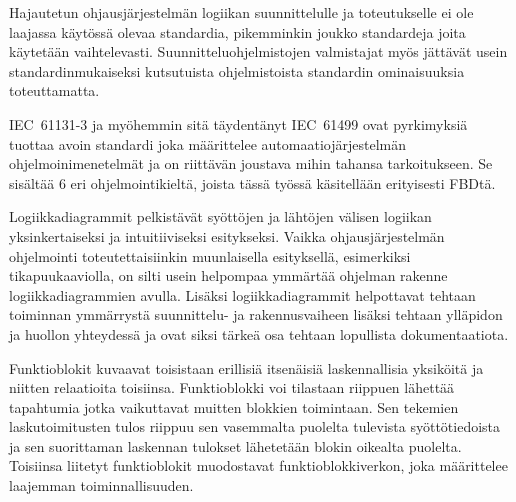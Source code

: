 \documentclass[finnish,12pt]{article}
\begin{document}
Hajautetun ohjausjärjestelmän logiikan suunnittelulle ja toteutukselle ei ole
laajassa käytössä olevaa standardia, pikemminkin joukko standardeja joita
käytetään vaihtelevasti. Suunnitteluohjelmistojen valmistajat myös jättävät usein
standardinmukaiseksi kutsutuista ohjelmistoista standardin ominaisuuksia toteuttamatta.\cite{RefWorks:42}

IEC~61131-3 ja myöhemmin sitä täydentänyt IEC~61499 ovat pyrkimyksiä tuottaa
avoin standardi joka määrittelee automaatiojärjestelmän ohjelmoinimenetelmät ja
on riittävän joustava mihin tahansa tarkoitukseen. Se sisältää 6 eri
ohjelmointikieltä, joista tässä työssä käsitellään erityisesti FBDtä.

Logiikkadiagrammit pelkistävät syöttöjen ja lähtöjen välisen logiikan
yksinkertaiseksi ja intuitiiviseksi esitykseksi. Vaikka ohjausjärjestelmän
ohjelmointi toteutettaisiinkin muunlaisella esityksellä, esimerkiksi
tikapuukaaviolla, on silti usein helpompaa ymmärtää ohjelman rakenne
logiikkadiagrammien avulla. Lisäksi logiikkadiagrammit helpottavat tehtaan
toiminnan ymmärrystä suunnittelu- ja rakennusvaiheen lisäksi tehtaan ylläpidon
ja huollon yhteydessä ja ovat siksi tärkeä osa tehtaan lopullista
dokumentaatiota.

Funktioblokit kuvaavat toisistaan erillisiä itsenäisiä laskennallisia yksiköitä
ja niitten relaatioita toisiinsa. Funktioblokki voi tilastaan riippuen lähettää
tapahtumia jotka vaikuttavat muitten blokkien toimintaan. Sen tekemien
laskutoimitusten tulos riippuu sen vasemmalta puolelta tulevista
syöttötiedoista ja sen suorittaman laskennan tulokset lähetetään blokin oikealta puolelta.
Toisiinsa liitetyt funktioblokit muodostavat funktioblokkiverkon, joka määrittelee laajemman toiminnallisuuden.



\end{document}
